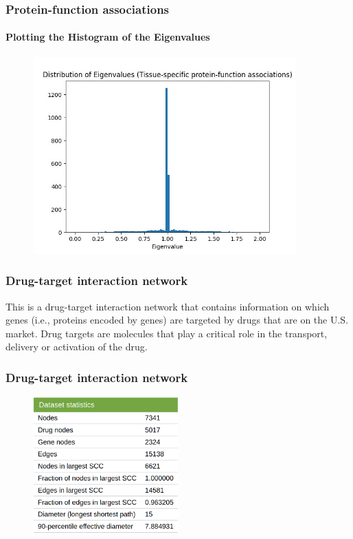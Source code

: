 \documentclass[aspectratio=43,leqno]{beamer}
\begin{document}
\begin{frame}
  \frametitle{Protein-function associations}
  \framesubtitle{Plotting the Histogram of the Eigenvalues}

 \begin{figure}[h]
    \centering
    \includegraphics[width=0.9\textwidth]{images/tfg-hist.jpeg}
    \label{fig:mesh1}
  \end{figure}
  
\end{frame}


\begin{frame}
  \frametitle{Drug-target interaction network}
  
This is a drug-target interaction network that contains information on which genes (i.e., proteins encoded by genes) are targeted by drugs that are on the U.S. market. Drug targets are molecules that play a critical role in the transport, delivery or activation of the drug. 

\end{frame}

\begin{frame}
  \frametitle{Drug-target interaction network}
  
    \begin{figure}[h]
    \centering
    \includegraphics[width=0.5\textwidth]{images/chg.png}
    \label{fig:mesh1}
  \end{figure}
  
\end{frame}
\end{document}
